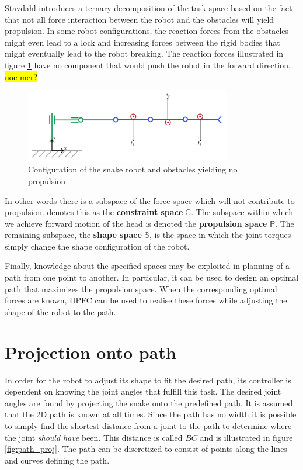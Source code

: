 Stavdahl \cite{StavdahlNote} introduces a ternary decomposition of the task space based on the fact that not all force interaction between the robot and the obstacles will yield propulsion. In some robot configurations, the reaction forces from the obstacles might even lead to a lock and increasing forces between the rigid bodies that might eventually lead to the robot breaking. The reaction forces illustrated in figure \ref{fig:noprop} have no component that would push the robot in the forward direction. \hl{noe mer?}

\begin{figure}[h!]
    \centering
    \includegraphics[width=0.8\textwidth]{figures/no_propulsion.PNG}
    \caption{Configuration of the snake robot and obstacles yielding no propulsion}
    \label{fig:noprop}
\end{figure}

In other words there is a subspace of the force space which will not contribute to propulsion. \cite{StavdahlNote} denotes this as the \textbf{constraint space} $\mathbb{C}$. The subspace within which we achieve forward motion of the head is denoted the \textbf{propulsion space} $\mathbb{P}$. The remaining subspace, the \textbf{shape space} $\mathbb{S}$, is the space in which the joint torques simply change the shape configuration of the robot.

Finally, knowledge about the specified spaces may be exploited in planning of a path from one point to another. In particular, it can be used to design an optimal path that maximizes the propulsion space. When the corresponding optimal forces are known, HPFC can be used to realise these forces while adjusting the shape of the robot to the path.


\section{Projection onto path}\label{sec:pathproj}
In order for the robot to adjust its shape to fit the desired path, its controller is dependent on knowing the joint angles that fulfill this task. The desired joint angles are found by projecting the snake onto the predefined path. It is assumed that the 2D path is known at all times. Since the path has no width it is possible to simply find the shortest distance from a joint to the path to determine where the joint \textit{should have} been. This distance is called $BC$ and is illustrated in figure \ref{fig:path_proj}. The path can be discretized to consist of points along the lines and curves defining the path.

